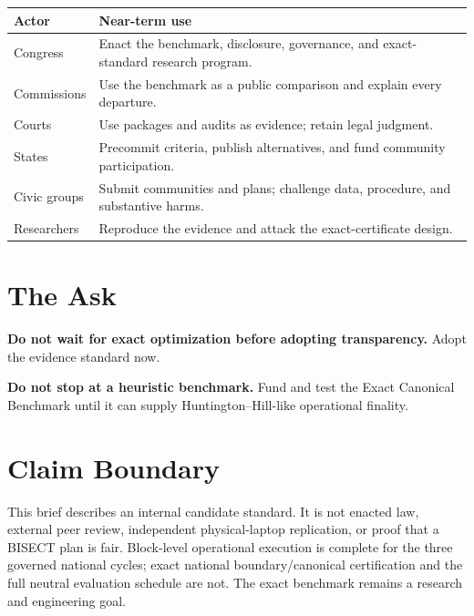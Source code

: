\documentclass[11pt,twocolumn]{article}
\begin{document}
\begin{tabular}{p{}p{}}
\toprule
Actor & Near-term use \\
\midrule
Congress & Enact the benchmark, disclosure, governance, and exact-standard research program. \\
Commissions & Use the benchmark as a public comparison and explain every departure. \\
Courts & Use packages and audits as evidence; retain legal judgment. \\
States & Precommit criteria, publish alternatives, and fund community participation. \\
Civic groups & Submit communities and plans; challenge data, procedure, and substantive harms. \\
Researchers & Reproduce the evidence and attack the exact-certificate design. \\
\bottomrule
\end{tabular}

\section*{The Ask}

\textbf{Do not wait for exact optimization before adopting transparency.}
Adopt the evidence standard now.

\textbf{Do not stop at a heuristic benchmark.}
Fund and test the Exact Canonical Benchmark until it can supply
Huntington--Hill-like operational finality.

\section*{Claim Boundary}

This brief describes an internal candidate standard. It is not enacted law,
external peer review, independent physical-laptop replication, or proof that a
BISECT plan is fair. Block-level operational execution is complete for the
three governed national cycles; exact national boundary/canonical certification
and the full neutral evaluation schedule are not. The exact benchmark remains a
research and engineering goal.
\end{document}
